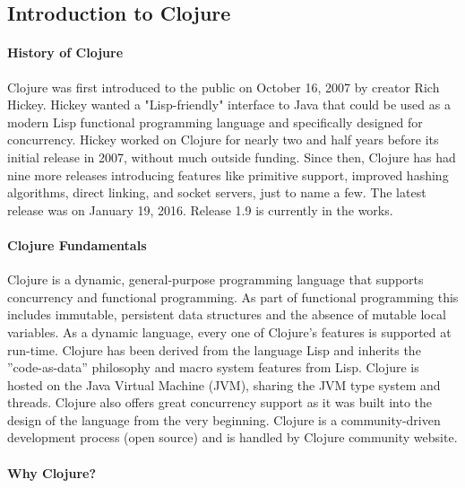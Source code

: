 \clojureColor
\subsection{Introduction to Clojure}

\paragraph{History of Clojure}
    
    Clojure was first introduced to the public on October 16, 2007 by creator Rich Hickey. Hickey wanted a "Lisp-friendly" interface to Java that could be used as a modern Lisp functional programming language and specifically designed for concurrency. Hickey worked on Clojure for nearly two and half years before its initial release in 2007, without much outside funding. Since then, Clojure has had nine more releases introducing features like primitive support, improved hashing algorithms, direct linking, and socket servers, just to name a few. The latest release was on January 19, 2016. Release 1.9 is currently in the works.
    \cite{ClojureHistory_GitHub_Website}
    
    
\paragraph{Clojure Fundamentals}
    
    Clojure is a dynamic, general-purpose programming language that supports concurrency and functional programming. As part of functional programming this includes immutable, persistent data structures and the absence of mutable local variables. As a dynamic language, every one of Clojure's features is supported at run-time. Clojure has been derived from the language Lisp and inherits the ''code-as-data'' philosophy and macro system features from Lisp. Clojure is hosted on the Java Virtual Machine (JVM), sharing the JVM type system and threads. Clojure also offers great concurrency support as it was built into the design of the language from the very beginning. Clojure is a community-driven development process (open source) and is handled by Clojure community website.  
    \cite{ClojureConcurrencySupport_Slides_Hickey}
    
\paragraph{Why Clojure?}
   
